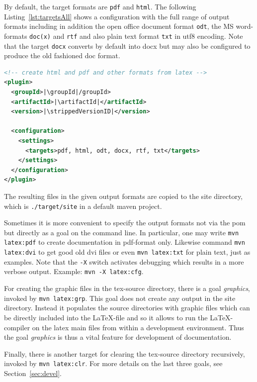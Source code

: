 \documentclass[12pt]{book}
\newcommand{\gls}[1]{#1}
\begin{document}
By default, the target formats are \texttt{pdf} and \texttt{html}. 
The following Listing~\ref{lst:targetsAll} shows a configuration 
with the full range of output formats including in addition 
the open office document format \texttt{odt}, 
the MS word-formats \texttt{doc(x)} and \texttt{rtf} %
and also plain text format \texttt{txt} in utf8 encoding. 
Note that the target \texttt{docx} converts by default into \gls{docx} 
but may also be configured to produce the old fashioned \gls{doc} format. 
%
\begin{lstlisting}[language=xml, basicstyle=\small,
escapechar=|,
float, captionpos=b, label={lst:targetsAll}, 
caption={Configuration with full range output formats}]
<!-- create html and pdf and other formats from latex -->
<plugin>
  <groupId>|\groupId|/groupId>
  <artifactId>|\artifactId|</artifactId>
  <version>|\strippedVersionID|</version>
	
  <configuration>
    <settings>
      <targets>pdf, html, odt, docx, rtf, txt</targets>
    </settings>
  </configuration>
</plugin>
\end{lstlisting}

The resulting files in the given output formats 
are copied to the site directory, 
which is \texttt{./target/site} in a default maven project. 

Sometimes it is more convenient 
to specify the output formats not via the pom 
but directly as a goal on the command line. 
In particular, one may write \texttt{mvn latex:pdf} to create documentation 
in pdf-format only.
Likewise command \texttt{mvn latex:dvi} to get good old dvi files
or even \texttt{mvn latex:txt} for plain text, just as examples. 
Note that the \texttt{-X} switch activates debugging 
which results in a more verbose output. 
Example: \texttt{mvn -X latex:cfg}. 

For creating the graphic files in the tex-source directory, 
there is a goal {\em graphics}, invoked by \texttt{mvn latex:grp}. 
This goal does not create any output in the site directory. 
Instead it populates the source directories 
with graphic files which can be directly included into the \LaTeX-file 
and so it allows to run the \LaTeX-compiler on the latex main files 
from within a development environment. 
Thus the goal {\em graphics\/} is thus a vital feature 
for development of documentation. 


Finally, there is another target for clearing the tex-source directory 
recursively, invoked by \texttt{mvn latex:clr}. 
For more details on the last three goals, see Section~\ref{sec:devel}. 
\end{document}
